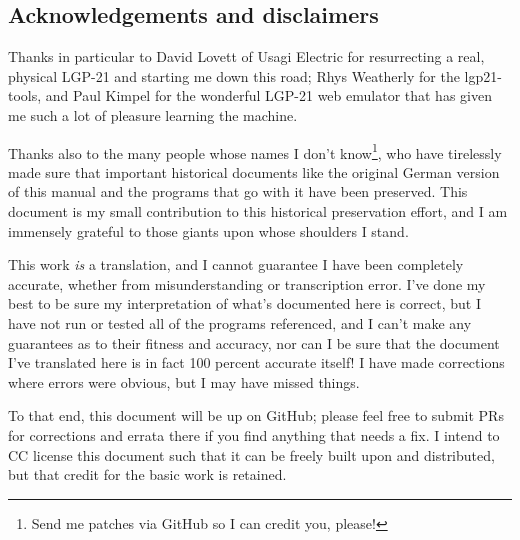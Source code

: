 \subsection{Acknowledgements and disclaimers}
Thanks in particular to David Lovett of Usagi Electric for resurrecting a real, physical LGP-21 and starting me down this road; Rhys Weatherly for the lgp21-tools, and Paul Kimpel for the wonderful LGP-21 web emulator that has given me such a lot of pleasure learning the machine.

Thanks also to the many people whose names I don't know\footnote{Send me patches via GitHub so I can credit you, please!}, who have tirelessly made sure that important historical documents like the original German version of this manual and the programs that go with it have been preserved. This document is my small contribution to this historical preservation effort, and I am immensely grateful to those giants upon whose shoulders I stand. 

This work \emph{is} a translation, and I cannot guarantee I have been completely accurate, whether from misunderstanding or transcription error. I've done my best to be sure my interpretation of what's documented here is correct, but I have not run or tested all of the programs referenced, and I can't make any guarantees as to their fitness and accuracy, nor can I be sure that the document I've translated here is in fact 100 percent accurate itself! I have made corrections where
errors were obvious, but I may have missed things.

To that end, this document will be up on GitHub; please feel free to submit PRs for corrections and errata there if you find anything that needs a fix. I intend to CC license this document such that it can be freely built upon and distributed, but that credit for the basic work is retained.

\newpage
